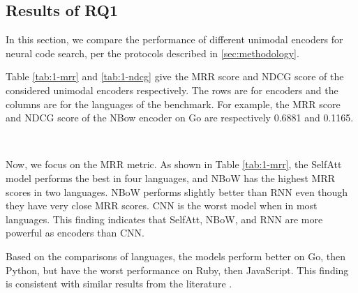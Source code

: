 \documentclass[conference]{IEEEtran}
\begin{document}
\subsection{Results of RQ1}

In this section, we compare the performance of different unimodal encoders for neural code search, per the protocols described in \autoref{sec:methodology}.

Table \ref{tab:1-mrr} and \ref{tab:1-ndcg} give the MRR score and NDCG score of the considered unimodal encoders respectively. The rows are for encoders and the columns are for the languages of the benchmark. For example, the MRR score and NDCG score of the NBow encoder on Go are respectively 0.6881 and 0.1165.

\begin{table}[thb]
\centering
\caption{RQ1: MRR Scores of Baseline Models}
~\\
\label{tab:1-mrr}
\end{table}
 

Now, we focus on the MRR metric. As shown in Table \ref{tab:1-mrr}, the SelfAtt model performs the best in four languages, and NBoW has the highest MRR scores in two languages. NBoW performs slightly better than RNN even though they have very close MRR scores. CNN is the worst model when in most languages. This finding indicates that SelfAtt, NBoW, and RNN are more powerful as encoders than CNN.

Based on the comparisons of languages, the models perform better on Go, then Python, but have the worst performance on Ruby, then JavaScript. This finding is consistent with similar results from the literature \cite{Husain2019CodeSearchNetCE}.
\end{document}
